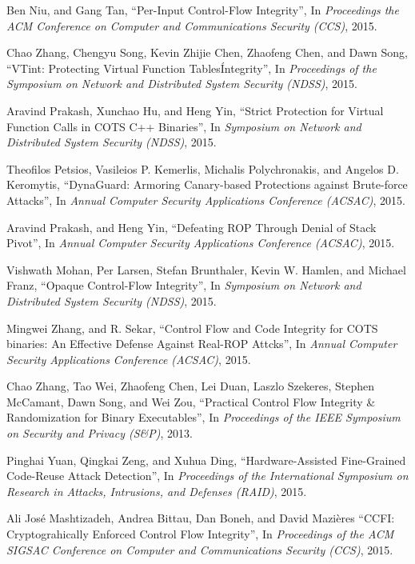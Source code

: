 \documentclass[11pt,a4paper,bibtotoc,idxtotoc,headsepline,footsepline,footexclude,BCOR20mm,DIV10]{scrbook}
\begin{document}
\begin{thebibliography}{50}
Ben Niu, and Gang Tan,
``{Per-Input Control-Flow Integrity}'', In
\emph{Proceedings the ACM Conference on Computer and Communications Security (CCS)}, 2015.

Chao Zhang, Chengyu Song, Kevin Zhijie Chen, Zhaofeng Chen, and Dawn Song,
``{VTint: Protecting Virtual Function Tables\' Integrity}'', In
\emph{Proceedings of the Symposium on Network and Distributed System Security (NDSS)}, 2015.

Aravind Prakash, Xunchao Hu, and Heng Yin,
``{Strict Protection for Virtual Function Calls in COTS C++ Binaries}'', In
\emph{Symposium on Network and Distributed System Security (NDSS)}, 2015.

Theofilos Petsios, Vasileios P. Kemerlis, Michalis Polychronakis, and Angelos D. Keromytis,	
``{DynaGuard: Armoring Canary-based Protections against Brute-force Attacks}'', In
\emph{Annual Computer Security Applications Conference (ACSAC)}, 2015.

Aravind Prakash, and Heng Yin,
``{Defeating ROP Through Denial of Stack Pivot}'', In
\emph{Annual Computer Security Applications Conference (ACSAC)}, 2015.

Vishwath Mohan, Per Larsen, Stefan Brunthaler, Kevin W. Hamlen, and Michael Franz,
``{Opaque Control-Flow Integrity}'', In
\emph{Symposium on Network and Distributed System Security (NDSS)}, 2015.

Mingwei Zhang,  and R. Sekar,
``{Control Flow and Code Integrity for COTS binaries: An Effective Defense Against Real-ROP Attcks}'', In
\emph{Annual Computer Security Applications Conference (ACSAC)}, 2015.

Chao Zhang, Tao Wei, Zhaofeng Chen, Lei Duan,
Laszlo Szekeres, Stephen McCamant, Dawn Song, and Wei Zou,
``{Practical Control Flow Integrity \& Randomization for Binary Executables}'', In
\emph{Proceedings of the IEEE Symposium on Security and Privacy (S\&P)}, 2013.

Pinghai Yuan, Qingkai Zeng, and Xuhua Ding,
``{Hardware-Assisted Fine-Grained Code-Reuse Attack Detection}'', In
\emph{Proceedings of the International Symposium on Research in Attacks, Intrusions, and Defenses (RAID)}, 2015.

Ali José Mashtizadeh, Andrea Bittau, Dan Boneh, and  David Mazières
``{CCFI: Cryptograhically Enforced Control Flow Integrity}'', In
\emph{Proceedings of the ACM SIGSAC Conference on Computer and Communications Security (CCS)}, 2015.


\end{thebibliography}
\end{document}
